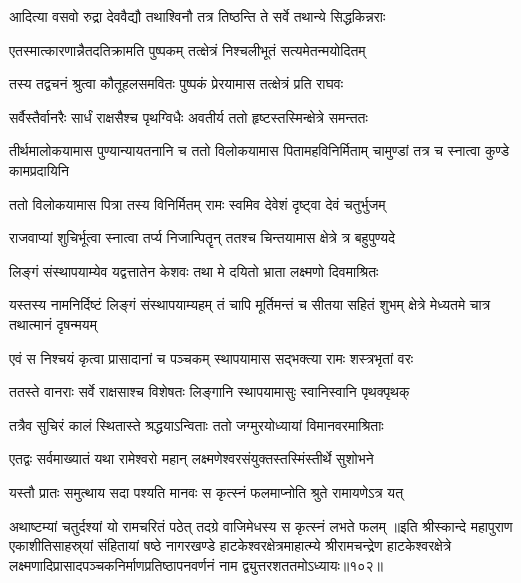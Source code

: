 \twolineshloka
{आदित्या वसवो रुद्रा देववैद्यौ तथाश्विनौ}
{तत्र तिष्ठन्ति ते सर्वे तथान्ये सिद्धकिन्नराः}%

\twolineshloka
{एतस्मात्कारणान्नैतदतिक्रामति पुष्पकम्}
{तत्क्षेत्रं निश्चलीभूतं सत्यमेतन्मयोदितम्}%


\twolineshloka
{तस्य तद्वचनं श्रुत्वा कौतूहलसमवितः} 
{पुष्पकं प्रेरयामास तत्क्षेत्रं प्रति राघवः} 

\twolineshloka
{सर्वैस्तैर्वानरैः सार्धं राक्षसैश्च पृथग्विधैः}
{अवतीर्य ततो हृष्टस्तस्मिन्क्षेत्रे समन्ततः}%

\threelineshloka
{तीर्थमालोकयामास पुण्यान्यायतनानि च}
{ततो विलोकयामास पितामहविनिर्मिताम्}
{चामुण्डां तत्र च स्नात्वा कुण्डे कामप्रदायिनि}%

\twolineshloka
{ततो विलोकयामास पित्रा तस्य विनिर्मितम्}
{रामः स्वमिव देवेशं दृष्ट्वा देवं चतुर्भुजम्}%

\twolineshloka
{राजवाप्यां शुचिर्भूत्वा स्नात्वा तर्प्य निजान्पितॄन्}
{ततश्च चिन्तयामास क्षेत्रे त्र बहुपुण्यदे}%

\twolineshloka
{लिङ्गं संस्थापयाम्येव यद्वत्तातेन केशवः}
{तथा मे दयितो भ्राता लक्ष्मणो दिवमाश्रितः}%

\threelineshloka
{यस्तस्य नामनिर्दिष्टं लिङ्गं संस्थापयाम्यहम्}
{तं चापि मूर्तिमन्तं च सीतया सहितं शुभम्}
{क्षेत्रे मेध्यतमे चात्र तथात्मानं दृषन्मयम्}%

\twolineshloka
{एवं स निश्चयं कृत्वा प्रासादानां च पञ्चकम्}
{स्थापयामास सद्भक्त्या रामः शस्त्रभृतां वरः}%

\twolineshloka
{ततस्ते वानराः सर्वे राक्षसाश्च विशेषतः}
{लिङ्गानि स्थापयामासुः स्वानिस्वानि पृथक्पृथक्}%

\twolineshloka
{तत्रैव सुचिरं कालं स्थितास्ते श्रद्धयाऽन्विताः}
{ततो जग्मुरयोध्यायां विमानवरमाश्रिताः}%

\twolineshloka
{एतद्वः सर्वमाख्यातं यथा रामेश्वरो महान्}
{लक्ष्मणेश्वरसंयुक्तस्तस्मिंस्तीर्थे सुशोभने}%

\twolineshloka
{यस्तौ प्रातः समुत्थाय सदा पश्यति मानवः}
{स कृत्स्नं फलमाप्नोति श्रुते रामायणेऽत्र यत्}%

\twolineshloka
{अथाष्टम्यां चतुर्दश्यां यो रामचरितं पठेत्}
{तदग्रे वाजिमेधस्य स कृत्स्नं लभते फलम्}%
॥इति श्रीस्कान्दे महापुराण एकाशीतिसाहस्र्यां संहितायां षष्ठे नागरखण्डे हाटकेश्वरक्षेत्रमाहात्म्ये श्रीरामचन्द्रेण हाटकेश्वरक्षेत्रे लक्ष्मणादिप्रासादपञ्चकनिर्माणप्रतिष्ठापनवर्णनं नाम द्व्युत्तरशततमोऽध्यायः॥१०२॥

